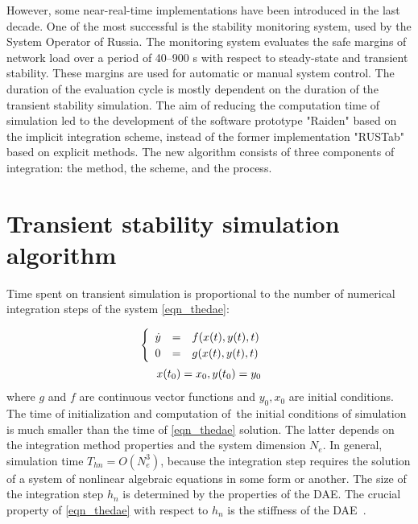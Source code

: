 \documentclass[lettersize,journal]{IEEEtran}
\begin{document}
However, some near-real-time implementations have been introduced in the last decade. One of the most successful is the stability monitoring system, used by the System Operator of Russia. The monitoring system evaluates the safe margins of network load over a period of 40–900 s with respect to steady-state and transient stability. These margins are used for automatic or manual system control. The duration of the evaluation cycle is mostly dependent on the duration of the transient stability simulation. The aim of reducing the computation time of simulation led to the development of the software prototype "Raiden" based on the implicit integration scheme, instead of the former implementation "RUSTab" based on explicit methods. The new algorithm consists of three components of integration: the method, the scheme, and the process. 
\section{Transient stability simulation algorithm}
Time spent on transient simulation is proportional to the number of numerical integration steps of the system \eqref{eqn_thedae}: 

\begin{equation}
	\label{eqn_thedae}
	\begin{array}{c}
		\begin{cases}
			\begin{array}{lcl}
				\dot{y}&=&f(x(t), y(t), t) \\
			 	      0&=&g(x(t), y(t), t)\\
			\end{array}
		\end{cases} 
	\vspace{0.5em} \\
	 x(t_0)=x_0, y(t_0)=y_0 \\
	\end{array}
\end{equation}
\noindent where \(g\) and \(f\) are continuous vector functions and \(y_0, x_0\) are initial conditions. The time of initialization and computation of the initial conditions of simulation is much smaller than the time of \eqref{eqn_thedae} solution. The latter depends on the integration method properties and the system dimension \(N_e\). In general, simulation time \(T_{hn}=O(N_e^3)\), because the integration step requires the solution of a system of nonlinear algebraic equations in some form or another. The size of the integration step \(h_n\) is determined by the properties of the DAE. The crucial property of \eqref{eqn_thedae} with respect to \(h_n\) is the stiffness of the DAE~\cite{hairer93}. 
\end{document}
